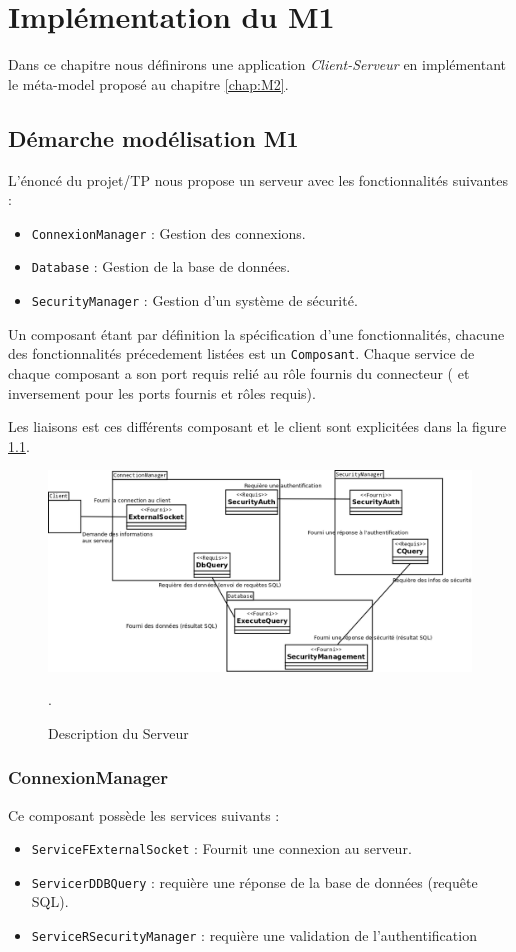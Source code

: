 \chapter{Implémentation du M1}
Dans ce chapitre nous définirons une application \textit{Client-Serveur} en implémentant le méta-model proposé au chapitre \ref{chap:M2}.

\section{Démarche modélisation M1}
L'énoncé du projet/TP nous propose un serveur avec les fonctionnalités suivantes :

\begin{itemize}
\item \verb+ConnexionManager+ :   Gestion des connexions. 
\item  \verb+Database+ :  Gestion de la base de données.
\item \verb+SecurityManager+ :  Gestion d'un système de sécurité.
\end{itemize}

Un composant étant par définition la spécification d'une fonctionnalités, chacune des fonctionnalités précedement listées est un \verb+Composant+. Chaque service de chaque composant a son port requis relié au rôle fournis  du connecteur ( et inversement pour les ports fournis et rôles requis).

Les liaisons est ces différents composant et le client sont explicitées dans la figure \ref{fig:desSer}.
\begin{figure}[htb]
  \centering
  \includegraphics[scale=0.32]{img/DescribServeur}
  \caption{Description du Serveur}
  \label{fig:desSer}.
\end{figure}


\subsection{ConnexionManager}
Ce composant possède les services suivants : 
\begin{itemize}
\item 
  \verb+ServiceFExternalSocket+ : Fournit une connexion au serveur.
\item 
  \verb+ServicerDDBQuery+ :  requière une réponse de la base de données (requête SQL).
\item 
  \verb+ServiceRSecurityManager+ :  requière une validation de l'authentification
\end{itemize}


